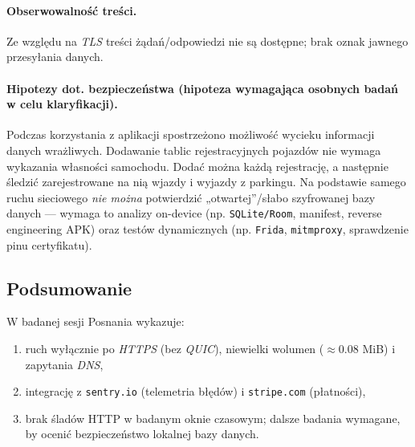 \paragraph{Obserwowalność treści.}
Ze względu na \emph{TLS} treści żądań/odpowiedzi nie są dostępne; brak oznak jawnego przesyłania danych.

\paragraph{Hipotezy dot. bezpieczeństwa (hipoteza wymagająca osobnych badań w celu klaryfikacji).}
Podczas korzystania z aplikacji spostrzeżono możliwość wycieku informacji danych wrażliwych. Dodawanie tablic rejestracyjnych pojazdów nie wymaga wykazania własności samochodu. Dodać można każdą rejestrację, a następnie śledzić zarejestrowane na nią wjazdy i wyjazdy z parkingu.
Na podstawie samego ruchu sieciowego \emph{nie można} potwierdzić „otwartej”/słabo szyfrowanej bazy danych — wymaga to analizy on-device (np. \texttt{SQLite/Room}, manifest, reverse engineering APK) oraz testów dynamicznych (np. \texttt{Frida}, \texttt{mitmproxy}, sprawdzenie pinu certyfikatu).

\subsection{Podsumowanie}
W badanej sesji Posnania wykazuje:
\begin{enumerate}
\item ruch wyłącznie po \emph{HTTPS} (bez \emph{QUIC}), niewielki wolumen ($\approx 0.08$ MiB) i zapytania \emph{DNS},
\item integrację z \texttt{sentry.io} (telemetria błędów) i \texttt{stripe.com} (płatności),
\item brak śladów HTTP w badanym oknie czasowym; dalsze badania wymagane, by ocenić bezpieczeństwo lokalnej bazy danych.
\end{enumerate}
